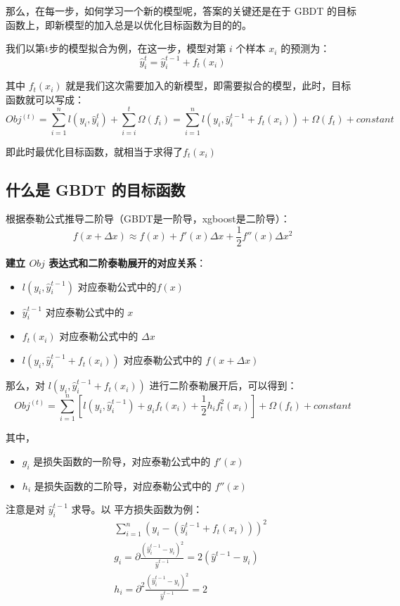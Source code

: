 \documentclass[12pt]{article}
\begin{document}
那么，在每一步，如何学习一个新的模型呢，答案的关键还是在于 GBDT 的目标函数上，即新模型的加入总是以优化目标函数为目的的。

我们以第t步的模型拟合为例，在这一步，模型对第 $i$ 个样本 $x_i$ 的预测为：
$$
\hat{y}_i^t = \hat{y}_i^{t-1} + f_t(x_i)
$$

其中 $f_t(x_i)$ 就是我们这次需要加入的新模型，即需要拟合的模型，此时，目标函数就可以写成：
$$
Obj^{(t)} = \sum_{i=1}^n{l(y_i,\hat{y}_i^t)} + \sum_{i=i}^{t}\Omega(f_i) = \sum_{i=1}^n{l(y_i,\hat{y}_i^{t-1} + f_t(x_i))} + \Omega(f_t) + constant
$$

即此时最优化目标函数，就相当于求得了$f_t(x_i)$

\subsection{什么是 GBDT 的目标函数}
根据泰勒公式推导二阶导（GBDT是一阶导，xgboost是二阶导）：
$$
f(x+\Delta x) \approx f(x) + f'(x)\Delta x + \frac{1}{2}f''(x)\Delta x^2
$$

\textbf{建立 $Obj$ 表达式和二阶泰勒展开的对应关系}：

\begin{itemize}[itemindent=2em]
    \item $l(y_i,\hat{y}_i^{t-1})$ 对应泰勒公式中的$f(x)$
    
    \item $\hat{y}_i^{t-1}$ 对应泰勒公式中的 $x$
    
    \item $f_t(x_i)$ 对应泰勒公式中的 $\Delta x$
    
    \item $l(y_i,\hat{y}_i^{t-1} + f_t(x_i))$ 对应泰勒公式中的 $f(x+\Delta x)$
\end{itemize}

那么，对 $l(y_i,\hat{y}_i^{t-1} + f_t(x_i))$ 进行二阶泰勒展开后，可以得到：
$$
Obj^{(t)} = \sum_{i=1}^n[l(y_i,\hat{y}_i^{t-1}) + g_if_t(x_i) + \frac{1}{2}h_if_t^2(x_i)] + \Omega (f_t) + constant
$$

其中，
\begin{itemize}[itemindent=2em]
    \item $g_i$ 是损失函数的一阶导，对应泰勒公式中的 $f'(x)$
    
    \item $h_i$ 是损失函数的二阶导，对应泰勒公式中的 $f''(x)$
\end{itemize}

注意是对 $\hat{y}_i^{t-1}$ 求导。以 平方损失函数为例：
\begin{eqnarray*}
    && \sum_{i=1}^n(y_i - (\hat{y}_i^{t-1}+f_t(x_i)))^2 \\
    && g_i = \partial{\frac{(\hat{y}_i^{t-1} - y_i)^2}{\hat{y}^{t-1}}} = 2(\hat{y}^{t-1} - y_i) \\
    && h_i = \partial ^2{\frac{(\hat{y}_i^{t-1} - y_i)^2}{\hat{y}^{t-1}}} = 2
\end{eqnarray*}
\end{document}
